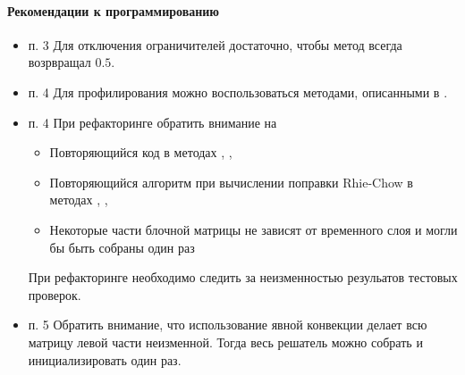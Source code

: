 \paragraph{Рекомендации к программированию}
\begin{itemize}
\item п. 3
Для отключения ограничителей достаточно, чтобы метод
 всегда возрвращал $0.5$.
\item п. 4
Для профилирования можно воспользоваться методами, описанными в .
\item п. 4
При рефакторинге обратить внимание на
\begin{itemize}
\item Повторяющийся код в методах , ,
\item Повторяющийся алгоритм при вычислении поправки Rhie-Chow в методах , ,
\item Некоторые части блочной матрицы не зависят от временного слоя и могли бы быть собраны один раз
\end{itemize}
При рефакторинге необходимо следить за неизменностью резульатов тестовых проверок.
\item п. 5
Обратить внимание, что использование явной конвекции делает всю матрицу левой части неизменной.
Тогда весь решатель можно собрать и инициализировать один раз.
\end{itemize}
